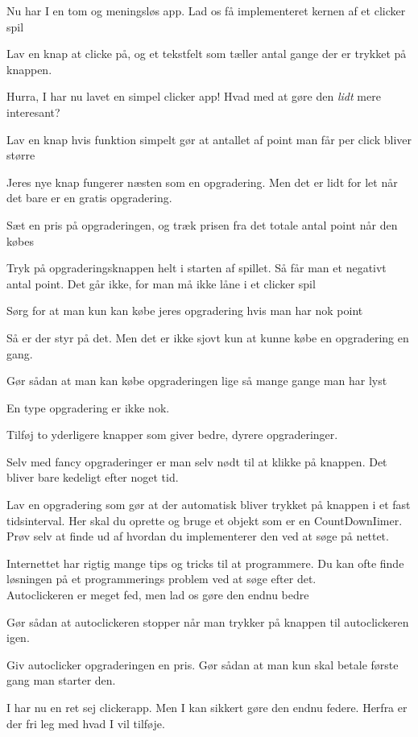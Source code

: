 Nu har I en tom og meningsløs app. Lad os få implementeret kernen af et clicker spil
\begin{exercise}
	Lav en knap at clicke på, og et tekstfelt som tæller antal gange der er trykket på knappen.
\end{exercise}
Hurra, I har nu lavet en simpel clicker app! Hvad med at gøre den \textit{lidt} mere interesant?
\begin{exercise}
	Lav en knap hvis funktion simpelt gør at antallet af point man får per click bliver større
\end{exercise}
Jeres nye knap fungerer næsten som en opgradering. Men det er lidt for let når det bare er en gratis opgradering. 
\begin{exercise}
	Sæt en pris på opgraderingen, og træk prisen fra det totale antal point når den købes
\end{exercise}
Tryk på opgraderingsknappen helt i starten af spillet. Så får man et negativt antal point. Det går ikke, for man må ikke låne i et clicker spil
\begin{exercise}
	Sørg for at man kun kan købe jeres opgradering hvis man har nok point
\end{exercise}
Så er der styr på det. Men det er ikke sjovt kun at kunne købe en opgradering en gang.
\begin{exercise}
	Gør sådan at man kan købe opgraderingen lige så mange gange man har lyst
\end{exercise}
En type opgradering er ikke nok. 
\begin{exercise}
	Tilføj to yderligere knapper som giver bedre, dyrere opgraderinger.
\end{exercise}
Selv med fancy opgraderinger er man selv nødt til at klikke på knappen. Det bliver bare kedeligt efter noget tid.
\begin{exercise}
	Lav en opgradering som gør at der automatisk bliver trykket på knappen i et fast tidsinterval.
	Her skal du oprette og bruge et objekt som er en CountDownIimer. Prøv selv at finde ud af hvordan du implementerer den ved at søge på nettet.
\end{exercise}
Internettet har rigtig mange tips og tricks til at programmere. Du kan ofte finde løsningen på et programmerings problem ved at søge efter det.\\
Autoclickeren er meget fed, men lad os gøre den endnu bedre
\begin{exercise}
	Gør sådan at autoclickeren stopper når man trykker på knappen til autoclickeren igen.
\end{exercise}
\begin{exercise}
	Giv autoclicker opgraderingen en pris. Gør sådan at man kun skal betale første gang man starter den. 
\end{exercise}
I har nu en ret sej clickerapp. Men I kan sikkert gøre den endnu federe. Herfra er der fri leg med hvad I vil tilføje. 

